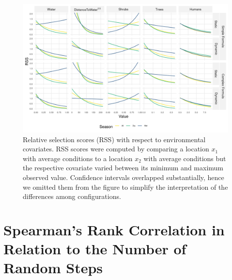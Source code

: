 \documentclass[../FinalThesis.tex]{subfiles}
\begin{document}
\begin{figure}[htpb]
 \begin{center}
  \includegraphics[width = \textwidth]{Figures/MovementModelInterpretation.png}
  \caption{Relative selection scores (RSS) with respect to environmental
  covariates. RSS scores were computed by comparing a location $x_1$ with
  average conditions to a location $x_2$ with average conditions but the
  respective covariate varied between its minimum and maximum observed value.
  Confidence intervals overlapped substantially, hence we omitted them from the
  figure to simplify the interpretation of the differences among
  configurations.}
  \label{MovementModelInterpretation}
 \end{center}
\end{figure}

\newpage
\section{Spearman's Rank Correlation in Relation to the Number of Random Steps}
\end{document}
